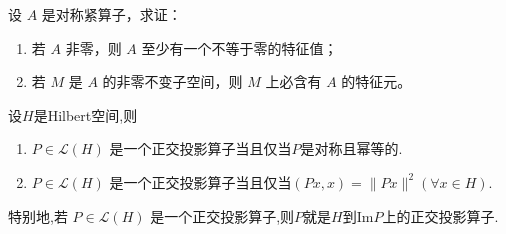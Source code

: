 \documentclass[../../main.tex]{subfiles}%
\begin{document}
\begin{example}
设 $A$ 是对称紧算子，求证：
\begin{enumerate}[(1)]
\item 若 $A$ 非零，则 $A$ 至少有一个不等于零的特征值；
\item 若 $M$ 是 $A$ 的非零不变子空间，则 $M$ 上必含有 $A$ 的特征元。
\end{enumerate}
\end{example}

\begin{proposition}\label{proposition:正交投影算子的充要条件}
设$H$是Hilbert空间,则
\begin{enumerate}[(1)]
\item\label{proposition:正交投影算子的充要条件-1} $P \in \mathscr{L}(H)$ 是一个正交投影算子当且仅当$P$是对称且幂等的.

\item\label{proposition:正交投影算子的充要条件-2} $P \in \mathscr{L}(H)$ 是一个正交投影算子当且仅当$(Px,x) = \|Px\|^2(\forall x \in H)$.
\end{enumerate}
特别地,若 $P \in \mathscr{L}(H)$ 是一个正交投影算子,则$P$就是$H$到$\text{Im}P$上的正交投影算子.
\end{proposition}
\end{document}
